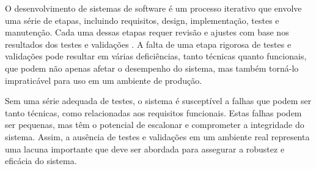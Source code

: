 O desenvolvimento de sistemas de software é um processo iterativo que envolve uma série de etapas, incluindo requisitos, design, implementação, testes e manutenção. Cada uma dessas etapas requer revisão e ajustes com base nos resultados dos testes e validações \cite{coleman2006softwareProcess}. A falta de uma etapa rigorosa de testes e validações pode resultar em várias deficiências, tanto técnicas quanto funcionais, que podem não apenas afetar o desempenho do sistema, mas também torná-lo impraticável para uso em um ambiente de produção.

Sem uma série adequada de testes, o sistema é susceptível a falhas que podem ser tanto técnicas, como relacionadas aos requisitos funcionais. Estas falhas podem ser pequenas, mas têm o potencial de escalonar e comprometer a integridade do sistema. Assim, a ausência de testes e validações em um ambiente real representa uma lacuna importante que deve ser abordada para assegurar a robustez e eficácia do sistema.
